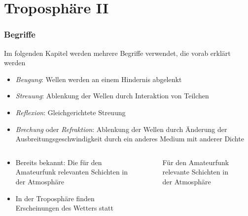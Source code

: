 
\section{Troposphäre II}
\label{section:troposphaere_2}
\begin{frame}%

\frametitle{Begriffe}
Im folgenden Kapitel werden mehrere Begriffe verwendet, die vorab erklärt werden

\begin{itemize}
  \item \emph{Beugung}: Wellen werden an einem Hindernis abgelenkt
  \item \emph{Streuung}: Ablenkung der Wellen durch Interaktion von Teilchen
  \item \emph{Reflexion}: Gleichgerichtete Streuung
  \item \emph{Brechung} oder \emph{Refraktion}: Ablenkung der Wellen durch Änderung der Ausbreitungsgeschwindigkeit durch ein anderes Medium mit anderer Dichte
  \end{itemize}
\end{frame}

\begin{frame}
\begin{columns}
    \begin{column}{0.48\textwidth}
    \begin{itemize}
  \item Bereits bekannt: Die für den Amateurfunk relevanten Schichten in der Atmosphäre
  \item In der Troposphäre finden Erscheinungen des Wetters statt
  \end{itemize}

    \end{column}
   \begin{column}{0.48\textwidth}
       
\begin{figure}
    \caption{\scriptsize Für den Amateurfunk relevante Schichten in der Atmosphäre}
    \label{e_atmosphaeren_schichten}
\end{figure}


   \end{column}
\end{columns}

\end{frame}

